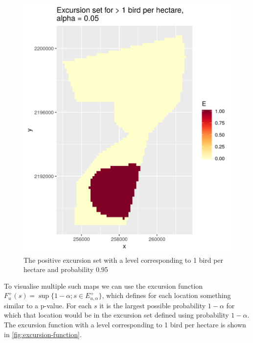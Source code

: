 \documentclass[preprint,12pt]{elsarticle}
\begin{document}
\begin{figure}
	\includegraphics[scale=0.5]{figures/excursion_set.png}
	\caption{The positive excursion set with a level corresponding to 1 bird per hectare and probability 0.95}
	\label{fig:excursion-set}
\end{figure}

To visualise multiple such maps we can use the excursion function $F_u^{+}(s) = \sup \{1 - \alpha ; s \in E_{u,\alpha}^+ \}$, which defines for each location something similar to a p-value.  For each $s$ it is the largest possible probability $1 -\alpha$ for which that location would be in the excursion set defined using probability $1 - \alpha$.  The excursion function with a level corresponding to 1 bird per hectare is shown in \autoref{fig:excursion-function}.
\end{document}
